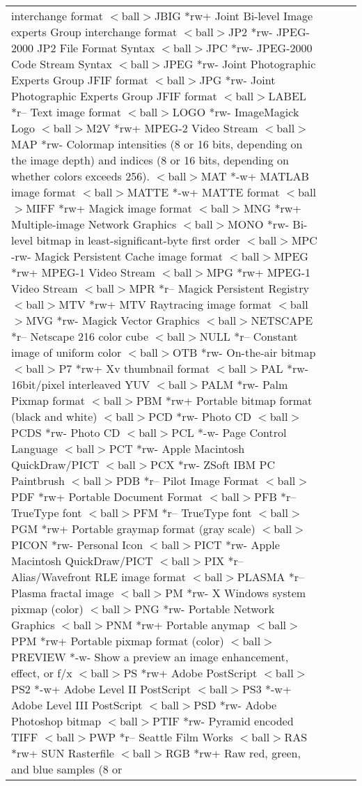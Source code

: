 \begin{longtable}{llll}
		interchange format
$<$ball$>$JBIG	*rw+	Joint Bi-level Image experts Group
		interchange format
$<$ball$>$JP2	*rw-	JPEG-2000 JP2 File Format Syntax
$<$ball$>$JPC	*rw-	JPEG-2000 Code Stream Syntax
$<$ball$>$JPEG	*rw-	Joint Photographic Experts Group
		JFIF format
$<$ball$>$JPG	*rw-	Joint Photographic Experts Group
		JFIF format
$<$ball$>$LABEL	*r--	Text image format
$<$ball$>$LOGO	*rw-	ImageMagick Logo
$<$ball$>$M2V	*rw+	MPEG-2 Video Stream
$<$ball$>$MAP	*rw-	Colormap intensities (8 or 16 bits,
		depending on the image depth) and
		indices (8 or 16 bits, depending
 	 	on whether colors exceeds 256).
$<$ball$>$MAT	*-w+	MATLAB image format
$<$ball$>$MATTE	*-w+	MATTE format
$<$ball$>$MIFF	*rw+	Magick image format
$<$ball$>$MNG	*rw+	Multiple-image Network Graphics
$<$ball$>$MONO	*rw-	Bi-level bitmap in least-significant-byte
		first order
$<$ball$>$MPC	-rw-	Magick Persistent Cache image format
$<$ball$>$MPEG	*rw+	MPEG-1 Video Stream
$<$ball$>$MPG	*rw+	MPEG-1 Video Stream
$<$ball$>$MPR	*r--	Magick Persistent Registry
$<$ball$>$MTV	*rw+	MTV Raytracing image format
$<$ball$>$MVG	*rw-	Magick Vector Graphics
$<$ball$>$NETSCAPE	*r--	Netscape 216 color cube
$<$ball$>$NULL	*r--	Constant image of uniform color
$<$ball$>$OTB	*rw-	On-the-air bitmap
$<$ball$>$P7	*rw+	Xv thumbnail format
$<$ball$>$PAL	*rw-	16bit/pixel interleaved YUV
$<$ball$>$PALM	*rw-	Palm Pixmap format
$<$ball$>$PBM	*rw+	Portable bitmap format (black and white)
$<$ball$>$PCD	*rw-	Photo CD
$<$ball$>$PCDS	*rw-	Photo CD
$<$ball$>$PCL	*-w-	Page Control Language
$<$ball$>$PCT	*rw-	Apple Macintosh QuickDraw/PICT
$<$ball$>$PCX	*rw-	ZSoft IBM PC Paintbrush
$<$ball$>$PDB	*r--	Pilot Image Format
$<$ball$>$PDF	*rw+	Portable Document Format
$<$ball$>$PFB	*r--	TrueType font
$<$ball$>$PFM	*r--	TrueType font
$<$ball$>$PGM	*rw+	Portable graymap format (gray scale)
$<$ball$>$PICON	*rw-	Personal Icon
$<$ball$>$PICT	*rw-	Apple Macintosh QuickDraw/PICT
$<$ball$>$PIX	*r--	Alias/Wavefront RLE image format
$<$ball$>$PLASMA	*r--	Plasma fractal image
$<$ball$>$PM	*rw-	X Windows system pixmap (color)
$<$ball$>$PNG	*rw-	Portable Network Graphics
$<$ball$>$PNM	*rw+	Portable anymap
$<$ball$>$PPM	*rw+	Portable pixmap format (color)
$<$ball$>$PREVIEW	*-w-	Show a preview an image enhancement,
		effect, or f/x
$<$ball$>$PS	*rw+	Adobe PostScript
$<$ball$>$PS2	*-w+	Adobe Level II PostScript
$<$ball$>$PS3	*-w+	Adobe Level III PostScript
$<$ball$>$PSD	*rw-	Adobe Photoshop bitmap
$<$ball$>$PTIF	*rw-	Pyramid encoded TIFF
$<$ball$>$PWP	*r--	Seattle Film Works
$<$ball$>$RAS	*rw+	SUN Rasterfile
$<$ball$>$RGB	*rw+	Raw red, green, and blue samples (8 or

\end{longtable}
